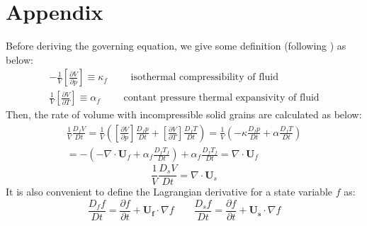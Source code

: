 \documentclass[preprint,12pt]{elsarticle}
\begin{document}
\appendix
\section{\textsf{Appendix}}
%
%
Before deriving the governing equation, we give some definition (following \cite{Kashiwa}) as below:
%
%
\begin{gather}
-\frac{1}{V} \left[ \frac{\partial V}{\partial p} \right] \equiv \kappa_f \qquad \mbox{ isothermal compressibility of fluid} \\
\frac{1}{V} \left[ \frac{\partial V}{\partial T} \right] \equiv \alpha_f \qquad \mbox{ contant pressure thermal expansivity of fluid}
\end{gather}
%
%
Then, the rate of volume with incompressible solid grains are calculated as below:
%
%
\begin{equation}
\label{fluidvolumerate}
\begin{gathered}
   \frac{1}{V} \frac{D_f V}{Dt} = \frac{1}{V} \left( \left[ \frac{\partial V}{\partial p} \right] \frac{D_f p}{D t} + \left[ \frac{\partial V}{\partial T} \right] \frac{D_f T}{D t} \right) = \frac{1}{V} \left( -\kappa \frac{D_f p}{D t} + \alpha \frac{D_f T}{D t} \right) \\
   = -(-\nabla \cdot \pmb{U}_f + \alpha_f \frac{D_f T_f}{Dt}) + \alpha_f \frac{D_f T_f}{Dt} = \nabla \cdot \pmb{U}_f
\end{gathered}
\end{equation}
%
%
\begin{equation}
\label{solidvolumerate}
 \frac{1}{V} \frac{D_s V}{D t} = \nabla \cdot \pmb{U}_s
\end{equation}
%
%
It is also convenient to define the Lagrangian derivative for a state variable $f$ as:
%
%
\begin{equation}
\frac{D_f f}{Dt} =  \frac{\partial f}{\partial t} + \pmb{U_f} \cdot \nabla f \qquad
\frac{D_s f}{Dt} =  \frac{\partial f}{\partial t} + \pmb{U_s} \cdot \nabla f
\end{equation}
%
%
\end{document}
